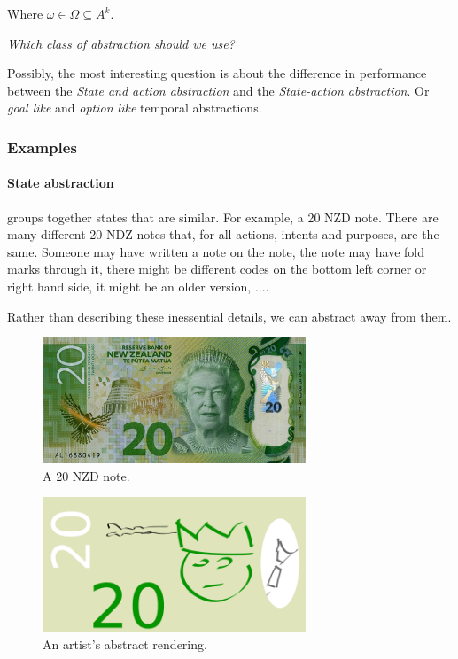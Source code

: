 Where $\omega \in \Omega \subseteq A^k$.



\begin{displayquote}
\textit{Which class of abstraction should we use?}
\end{displayquote}

Possibly, the most interesting question is about the difference in performance between
the \textit{State and action abstraction} and the \textit{State-action abstraction}.
Or \textit{goal like} and \textit{option like} temporal abstractions.

\subsubsection{Examples}

\paragraph{State abstraction}

groups together states that are similar. For example, a 20 NZD note.
There are many different 20 NDZ notes that, for all actions, intents and purposes, are the same.
Someone may have written a note on the note, the note may have fold marks through it,
there might be different codes on the
bottom left corner or right hand side, it might be an older version, ....

Rather than describing these inessential details, we can abstract away from them.

\begin{figure}[h!]
\centering
\includegraphics[width=0.7\textwidth,height=0.2\textheight]{../../pictures/images/nz20.png}
\caption{A 20 NZD note.}
\end{figure}

\begin{figure}[h!]
\centering
\includegraphics[width=0.7\textwidth,height=0.2\textheight]{../../pictures/drawings/my-nz20.png}
\caption{An artist's abstract rendering.}
\end{figure}


